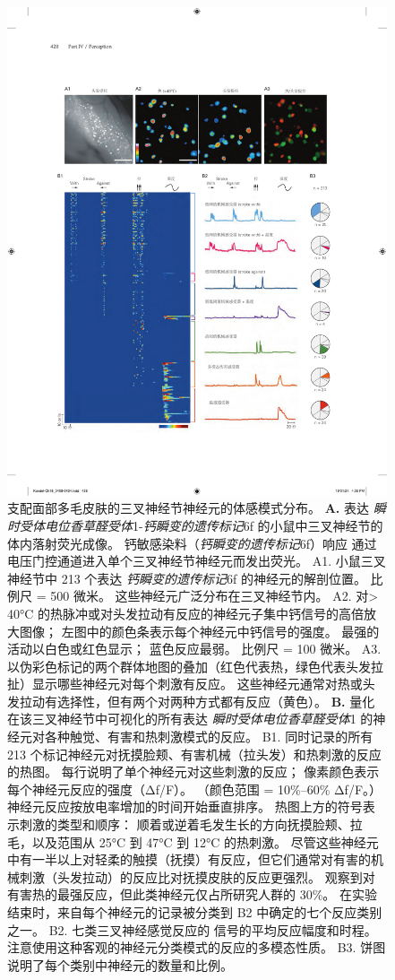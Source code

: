 \begin{figure}[htbp]
	\centering
	\includegraphics[width=0.85\linewidth]{chap18/fig_18_12}
	\caption{支配面部多毛皮肤的三叉神经节神经元的体感模式分布\cite{ghitani2017specialized}。
		\textbf{A.} 表达 \textit{瞬时受体电位香草醛受体}1-\textit{钙瞬变的遗传标记}6f 的小鼠中三叉神经节的体内落射荧光成像。 
		钙敏感染料（\textit{钙瞬变的遗传标记}6f）响应  通过电压门控通道进入单个三叉神经节神经元而发出荧光。
		A1. 小鼠三叉神经节中 213 个表达 \textit{钙瞬变的遗传标记}6f 的神经元的解剖位置。
		比例尺 = 500 微米。
		这些神经元广泛分布在三叉神经节内。 
		A2. 对> 40°C 的热脉冲或对头发拉动有反应的神经元子集中钙信号的高倍放大图像；
		左图中的颜色条表示每个神经元中钙信号的强度。
		最强的活动以白色或红色显示；
		蓝色反应最弱。
		比例尺 = 100 微米。
		A3. 以伪彩色标记的两个群体地图的叠加（红色代表热，绿色代表头发拉扯）显示哪些神经元对每个刺激有反应。
		这些神经元通常对热或头发拉动有选择性，但有两个对两种方式都有反应（黄色）。
		\textbf{B.} 量化在该三叉神经节中可视化的所有表达 \textit{瞬时受体电位香草醛受体}1 的神经元对各种触觉、有害和热刺激模式的反应。
		B1. 同时记录的所有 213 个标记神经元对抚摸脸颊、有害机械（拉头发）和热刺激的反应的热图。
		每行说明了单个神经元对这些刺激的反应；
		像素颜色表示每个神经元反应的强度（Δf/F）。
		（颜色范围 = 10\%–60\% Δf/F。）
		神经元反应按放电率增加的时间开始垂直排序。
		热图上方的符号表示刺激的类型和顺序：
		顺着或逆着毛发生长的方向抚摸脸颊、拉毛，以及范围从 25°C 到 47°C 到 12°C 的热刺激。
		尽管这些神经元中有一半以上对轻柔的触摸（抚摸）有反应，但它们通常对有害的机械刺激（头发拉动）的反应比对抚摸皮肤的反应更强烈。
		观察到对有害热的最强反应，但此类神经元仅占所研究人群的 30\%。
		在实验结束时，来自每个神经元的记录被分类到 B2 中确定的七个反应类别之一。
		B2. 七类三叉神经感觉反应的  信号的平均反应幅度和时程。 注意使用这种客观的神经元分类模式的反应的多模态性质。
		B3. 饼图说明了每个类别中神经元的数量和比例。}
	\label{fig:18_12}
\end{figure}


